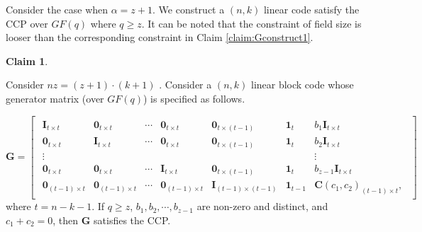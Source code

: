 \documentclass[journal,twocolumn]{IEEEtran}
\theoremstyle{definition}
\newtheorem{claim}{Claim}
\newcommand{\bfG}{\mathbf{G}}
\newcommand{\bfI}{\mathbf{I}}
\newcommand{\bfC}{\mathbf{C}}
\newcommand{\bfzr}{\mathbf{0}}
\newcommand{\bfoe}{\mathbf{1}}
\newcommand{\aditya}[1]{\marginpar{+}{\bf Aditya's remark}: {\em #1}}
\newcommand{\litang}[1]{\marginpar{+}{\bf Li's remark}: {\em #1}}
\begin{document}
Consider the case when $\alpha=z+1$. We construct a $(n,k)$ linear code satisfy the CCP over $GF(q)$ where $q\ge z$. It can be noted that the constraint of field size is looser than the corresponding constraint in Claim \ref{claim:Gconstruct1}. %
\begin{claim}
\label{claim:Gconstruct2}

Consider $nz=(z+1)\cdot (k+1)$ . Consider a $(n,k)$ linear block code whose generator matrix (over $GF(q)$) is specified as follows. %

\begin{equation}
\label{eq:Gconstruct2}
\bfG=
\begin{bmatrix}
\begin{smallmatrix}
\bfI_{t\times t}&\bfzr_{t\times t}&\cdots&\bfzr_{t\times t}&\bfzr_{t\times (t-1)}&\bfoe_t&{b_1}\bfI_{t\times t}\\
\bfzr_{t\times t}&\bfI_{t\times t}&\cdots&\bfzr_{t\times t}&\bfzr_{t\times (t-1)}&\bfoe_t&{b_2}\bfI_{t\times t}\\
\vdots&&&&&&\vdots\\
\bfzr_{t\times t}&\bfzr_{t\times t}&\cdots&\bfI_{t\times t}&\bfzr_{t\times (t-1)}&\bfoe_t&{b_{z-1}}\bfI_{t\times t}\\
\bfzr_{(t-1)\times t}&\bfzr_{(t-1)\times t}&\cdots&\bfzr_{(t-1)\times t}&\bfI_{(t-1)\times (t-1)}&\bfoe_{t-1}&\bfC(c_1, c_2)_{(t-1)\times t},
\end{smallmatrix}
\end{bmatrix}
\end{equation}
where $t=n-k-1$. If $q\ge z$, $b_1,b_2,\cdots,b_{z-1}$ are non-zero and distinct, and $c_1+c_2=0$, then $\bfG$ satisfies the CCP.


\end{claim}
\end{document}
